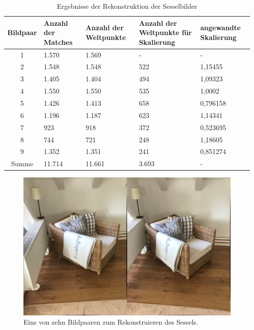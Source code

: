 \begin{table}
    \begin{tabularx}{\textwidth}{cXXXX}
        \toprule
        Bildpaar &  Anzahl der Matches & Anzahl der Weltpunkte & Anzahl der Weltpunkte für Skalierung
 & angewandte Skalierung \\ 
        \midrule
        1 & 1.570 & 1.569 & -  & - \\
        2 & 1.548 & 1.548 & 522 & 1,15455 \\
        3 & 1.405 & 1.404 & 494 & 1,09323 \\
        4 & 1.550 & 1.550 & 535 & 1,0002 \\
        5 & 1.426 & 1.413 & 658 & 0,796158 \\
        6 & 1.196 & 1.187 & 623 & 1,14341 \\
        7 & 923 & 918 & 372 & 0,523695 \\
        8 & 744 & 721 & 248 & 1,18605 \\
        9 & 1.352 & 1.351 & 241 & 0,851274 \\
        \midrule
        Summe & 11.714 & 11.661 & 3.693 & - \\
        \bottomrule
    \end{tabularx}
    \caption{Ergebnisse der Rekonstruktion der Sesselbilder}
    \label{tab:chair-results}
\end{table}

\begin{figure}
    \includegraphics[width=\textwidth]{src/img/chair_first_pair.jpg}
    \caption{Eins von zehn Bildpaaren zum Rekonstruieren des Sessels.}
    \label{fig:chair-first-pair}
\end{figure}

